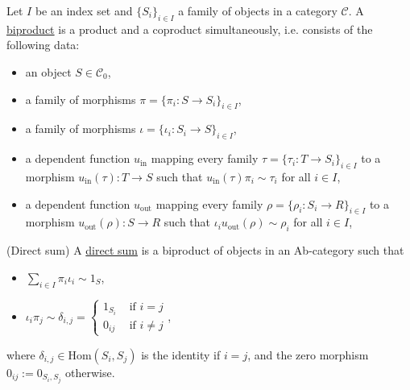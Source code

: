 \begin{definition}[Biproduct]\label{def:biproduct}
Let $I$ be an index set and $\{S_{i}\}_{i\in I}$ a family of objects in a category $\mathcal{C}$.
A \ul{biproduct} is a product and a coproduct simultaneously, i.e. consists of the following data:
\begin{itemize}
\item an object $S \in \mathcal{C}_{0}$,
\item a family of morphisms $\pi = \{ \pi_{i} : S \rightarrow S_{i} \}_{i\in I}$,
\item a family of morphisms $\iota = \{ \iota_{i} : S_{i} \rightarrow S \}_{i\in I}$,
\item a dependent function $u_{\text{in}}$ mapping every family $\tau = \{ \tau_{i} : T \rightarrow S_{i} \}_{i\in I}$ to a morphism
$u_{\text{in}}(\tau) : T \rightarrow S$ such that $u_{\text{in}}(\tau) \pi_{i} \sim \tau_{i}$ for all $i \in I$,
\item a dependent function $u_{\text{out}}$ mapping every family $\rho = \{ \rho_{i} : S_{i} \rightarrow R \}_{i\in I}$ to a morphism
$u_{\text{out}}(\rho) : S \rightarrow R$ such that $\iota_{i} u_{\text{out}}(\rho) \sim \rho_{i}$ for all $i \in I$,
\end{itemize}
\end{definition}

\begin{definition}{(Direct sum)}\label{def:direct_sum}
A \ul{direct sum} is a biproduct of objects in an Ab-category such that
\begin{itemize}
\item $\sum_{i\in I}  \pi_{i} \iota_{i} \sim 1_{S}$,
\item $ \iota_{i} \pi_{j} \sim \delta_{i, j} =  \begin{cases}
            1_{S_{i}} & \text{ if } i = j  \\
            0_{ij} & \text{ if } i \neq j
        \end{cases}$,
\end{itemize}
where $\delta_{i, j} \in \mathrm{Hom}(S_{i}, S_{j})$ is the identity if $i = j$, and the zero morphism $0_{ij} := 0_{S_{i}, S_{j}}$ otherwise.
\end{definition}

